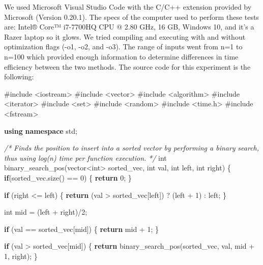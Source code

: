 \documentclass[11pt]{article}
\newenvironment{Shaded}{}{}
\newcommand{\KeywordTok}[1]{\textcolor[rgb]{0.00,0.44,0.13}{\textbf{{#1}}}}
\newcommand{\DataTypeTok}[1]{\textcolor[rgb]{0.56,0.13,0.00}{{#1}}}
\newcommand{\DecValTok}[1]{\textcolor[rgb]{0.25,0.63,0.44}{{#1}}}
\newcommand{\CommentTok}[1]{\textcolor[rgb]{0.38,0.63,0.69}{\textit{{#1}}}}
\newcommand{\NormalTok}[1]{{#1}}
\newcommand{\ImportTok}[1]{{#1}}
\newcommand{\ControlFlowTok}[1]{\textcolor[rgb]{0.00,0.44,0.13}{\textbf{{#1}}}}
\newcommand{\PreprocessorTok}[1]{\textcolor[rgb]{0.74,0.48,0.00}{{#1}}}
\begin{document}
We used Microsoft Visual Studio Code with the C/C++ extension provided
by Microsoft (Version 0.20.1). The specs of the computer used to perform
these tests are: Intel® Core™ i7-7700HQ CPU @ 2.80 GHz, 16 GB, Windows
10, and it's a Razer laptop so it glows. We tried compiling and
executing with and without optimization flags (-o1, -o2, and -o3). The
range of inputs went from n=1 to n=100 which provided enough information
to determine differences in time efficiency between the two methods. The
source code for this experiment is the following:

    \begin{Shaded}
\begin{Highlighting}[]
\PreprocessorTok{#include }\ImportTok{<iostream>}
\PreprocessorTok{#include }\ImportTok{<vector>}
\PreprocessorTok{#include }\ImportTok{<algorithm>}
\PreprocessorTok{#include }\ImportTok{<iterator>}
\PreprocessorTok{#include }\ImportTok{<set>}
\PreprocessorTok{#include }\ImportTok{<random>}
\PreprocessorTok{#include }\ImportTok{<time.h>}
\PreprocessorTok{#include }\ImportTok{<fstream>}
 
\KeywordTok{using} \KeywordTok{namespace}\NormalTok{ std;}
 
\CommentTok{/*}
\CommentTok{ Finds the position to insert into a sorted vector by performing a binary}
\CommentTok{ search, thus using log(n) time per function execution.}
\CommentTok{*/}
\DataTypeTok{int}\NormalTok{ binary_search_pos(vector<}\DataTypeTok{int}\NormalTok{> sorted_vec, }\DataTypeTok{int}\NormalTok{ val, }\DataTypeTok{int}\NormalTok{ left, }\DataTypeTok{int}\NormalTok{ right) }
\NormalTok{\{ }
    \ControlFlowTok{if}\NormalTok{(sorted_vec.size() == }\DecValTok{0}\NormalTok{) \{}
        \ControlFlowTok{return} \DecValTok{0}\NormalTok{;}
\NormalTok{    \}}
 
    \ControlFlowTok{if}\NormalTok{ (right <= left) \{}
        \ControlFlowTok{return}\NormalTok{ (val > sorted_vec[left]) ?  (left + }\DecValTok{1}\NormalTok{) : left; }
\NormalTok{    \}}
  
    \DataTypeTok{int}\NormalTok{ mid = (left + right)/}\DecValTok{2}\NormalTok{; }
  
    \ControlFlowTok{if}\NormalTok{ (val == sorted_vec[mid]) \{}
        \ControlFlowTok{return}\NormalTok{ mid + }\DecValTok{1}\NormalTok{; }
\NormalTok{    \}}
  
    \ControlFlowTok{if}\NormalTok{ (val > sorted_vec[mid]) \{}
        \ControlFlowTok{return}\NormalTok{ binary_search_pos(sorted_vec, val, mid + }\DecValTok{1}\NormalTok{, right); }
\NormalTok{    \}}
 

\end{Highlighting}
\end{Shaded}
\end{document}
